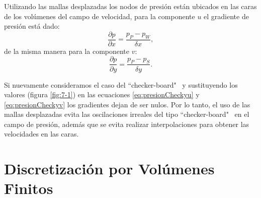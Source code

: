 \documentclass[a4paper,10pt, oneside]{book}
\begin{document}
Utilizando las mallas desplazadas los nodos de presión están ubicados en las caras de los volúmenes del campo de velocidad, para la componente $u$ el gradiente de presión está dado:
\begin{equation}
  \frac{\partial p}{\partial x} = \frac{p_P - p_W}{ \delta x},
  \label{eq:presionCheckyu}
\end{equation}
de la misma manera para la componente $v$:
\begin{equation}
  \frac{\partial p}{\partial y} = \frac{p_P - p_S}{ \delta y}.
  \label{eq:presionCheckyv}
\end{equation}

Si nuevamente consideramos el caso del ``checker-board" \ y sustituyendo los valores (figura \ref{fig:7-1}) en las ecuaciones \ref{eq:presionCheckyu} y \ref{eq:presionCheckyv} los gradientes dejan de ser nulos. Por lo tanto, el uso de las mallas desplazadas evita las oscilaciones irreales del tipo ``checker-board" \ en el campo de presión, además que se evita realizar interpolaciones para obtener las velocidades en las caras.

\section{Discretización por Volúmenes Finitos}
\end{document}
